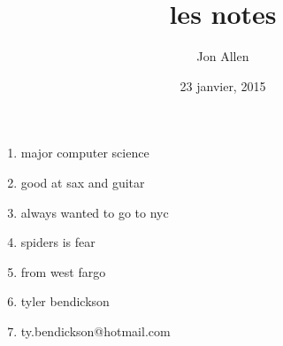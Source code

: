\documentclass[letterpaper]{article}
\begin{document}
\title{les notes}
\date{23 janvier, 2015}
\author{Jon Allen}
\maketitle
\begin{enumerate}
\item
major computer science
\item

good at sax and guitar
\item
always wanted to go to nyc
\item
spiders is fear
\item
from west fargo
\item
tyler bendickson
\item
ty.bendickson@hotmail.com
\end{enumerate}
\end{document}
